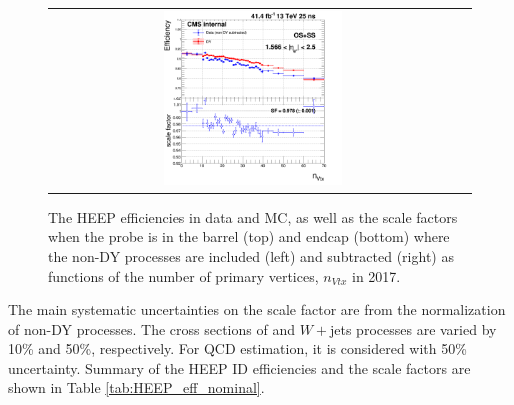 \begin{figure}[bh]
\begin{center}
\begin{tabular}{cc}
      \includegraphics[width=0.45\textwidth]{figures/Zprime/2017/ScaleFactor/SameSign/nominal/g_compare_cut_nVtx_Endcap_ea_ta_exc_AS_nominal_PUW.png}
    \end{tabular}
    \caption{The HEEP efficiencies in data and MC, as well as the scale factors when the probe is in the barrel (top) and endcap (bottom) where the non-DY processes are included (left) and subtracted (right) as functions of the number of primary vertices, $n_{Vtx}$ in 2017.}
    \label{fig:eff_SS_nominal_nVtx_2017}
  \end{center}
\end{figure}

\clearpage

The main systematic uncertainties on the scale factor are from the normalization of non-DY processes.
The cross sections of \ttbar and $W+$jets processes are varied by 10\% and 50\%, respectively.
For QCD estimation, it is considered with 50\% uncertainty.
Summary of the HEEP ID efficiencies and the scale factors are shown in Table \ref{tab:HEEP_eff_nominal}.

